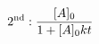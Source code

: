 \documentclass[preview]{standalone}
\begin{document}
\begin{align*}
\special{dvisvgm:raw <g id='unique000'>}2^{\text{nd}}: \frac{[A]_0}{1 + [A]_0 kt}\special{dvisvgm:raw </g>}
\end{align*}
\end{document}
